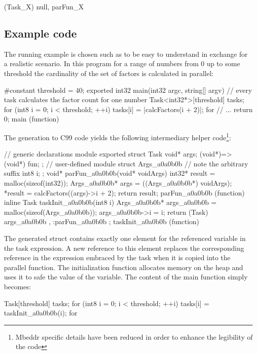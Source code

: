 \begin{ccode}
(Task_X){ null, parFun_X }
\end{ccode}

\subsection{Example code}
The running example is chosen such as to be easy to understand in exchange for a realistic scenario. In this program for a range of numbers from 0 up to some threshold the cardinality of the set of factors is calculated in parallel:

\begin{ccode}
#constant threshold = 40; 
exported int32 main(int32 argc, string[] argv) { 
  // every task calculates the factor count for one number
  Task<int32*>[threshold] tasks; 
  for (int8 i = 0; i < threshold; ++i) { 
    tasks[i] = |calcFactors(i + 2)|; 
  } for 
  // ...
  return 0; 
} main (function)

\end{ccode}

The generation to C99 code yields the following intermediary helper code\footnote{Mbeddr specific details have been reduced in order to enhance the legibility of the code}:
\begin{ccode}
// generic declarations module
exported struct Task {
  void* args; 
  (void*)=>(void*) fun; 
};
// user-defined module
struct Args_a0a0b0b { // note the arbitrary suffix
  int8 i;             
};
void* parFun_a0a0b0b(void* voidArgs) { 
  int32* result = malloc(sizeof(int32)); 
  Args_a0a0b0b* args = ((Args_a0a0b0b*) voidArgs); 
  *result = calcFactors((args)->i + 2); 
  return result; 
} parFun_a0a0b0b (function)             
inline Task taskInit_a0a0b0b(int8 i) { 
  Args_a0a0b0b* args_a0a0b0b = malloc(sizeof(Args_a0a0b0b)); 
  args_a0a0b0b->i = i; 
  return (Task){ args_a0a0b0b , :parFun_a0a0b0b }; 
} taskInit_a0a0b0b (function)
\end{ccode}
The generated struct contains exactly one element for the referenced variable in the task expression. A new reference to this element replaces the corresponding reference in the expression embraced by the task when it is copied into the parallel function. The initialization function allocates memory on the heap and uses it to safe the value of the variable. The content of the main function simply becomes:
\begin{ccode}
Task[threshold] tasks; 
for (int8 i = 0; i < threshold; ++i) { 
  tasks[i] = taskInit_a0a0b0b(i); 
} for
\end{ccode}


